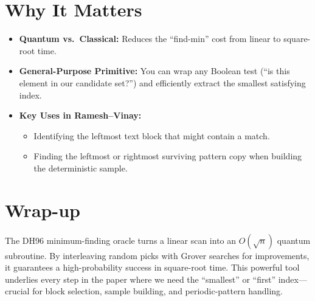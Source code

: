 \documentclass[11pt]{article}
\begin{document}
\section*{Why It Matters}
\begin{itemize}
  \item \textbf{Quantum vs.\ Classical:} Reduces the “find-min” cost from linear to square-root time.
  \item \textbf{General-Purpose Primitive:} You can wrap any Boolean test (“is this element in our candidate set?”) and efficiently extract the smallest satisfying index.
  \item \textbf{Key Uses in Ramesh--Vinay:}
        \begin{itemize}
          \item Identifying the leftmost text block that might contain a match.
          \item Finding the leftmost or rightmost surviving pattern copy when building the deterministic sample.
        \end{itemize}
\end{itemize}

\section*{Wrap-up}
The DH96 minimum-finding oracle turns a linear scan into an \(O(\sqrt{n})\) quantum subroutine. By interleaving random picks with Grover searches for improvements, it guarantees a high-probability success in square-root time. This powerful tool underlies every step in the paper where we need the “smallest” or “first” index—crucial for block selection, sample building, and periodic-pattern handling.
\end{document}
